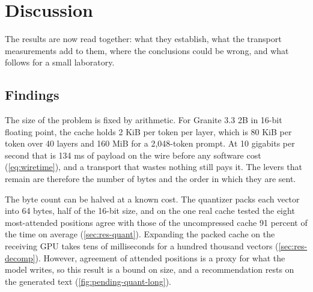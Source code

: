 
\section{Discussion}
\label{ch:discussion}

The results are now read together: what they establish, what the transport
measurements add to them, where the conclusions could be wrong, and what
follows for a small laboratory.

\subsection{Findings}

The size of the problem is fixed by arithmetic. For Granite
3.3 2B in 16-bit floating point, the cache holds 2 KiB per token per layer,
which is 80 KiB per token over 40 layers and 160 MiB for a 2,048-token
prompt. At 10 gigabits per second that is 134 ms of payload on the wire
before any software cost (\cref{eq:wiretime}), and a transport that wastes
nothing still pays it. The levers that remain are therefore the number of
bytes and the order in which they are sent.

The byte count can be halved at a known cost. The quantizer packs
each vector into 64 bytes, half of the 16-bit size, and on the one real cache
tested the eight most-attended positions agree with those of the uncompressed
cache 91 percent of the time on average (\cref{sec:res-quant}). Expanding the
packed cache on the receiving GPU takes tens of milliseconds for a hundred
thousand vectors (\cref{sec:res-decomp}). However, agreement of attended
positions is a proxy for what the model writes, so this result is a bound on
size, and a recommendation rests on the generated text
(\cref{fig:pending-quant-long}).

